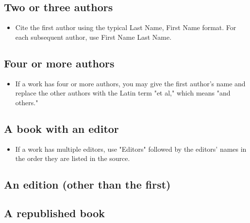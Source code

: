 {\subsection{Two or three authors}



\begin{itemize}\item Cite the first author using the typical Last Name, First Name format. For each subsequent author, use First Name Last Name.\end{itemize}

\subsection{Four or more authors}



\begin{itemize}\item If a work has four or more authors, you may give the first author's name and replace the other authors with the Latin term "et al," which means "and others." \end{itemize}

\subsection{A book with an editor}

\begin{itemize}\item If a work has multiple editors, use "Editors" followed by the editors' names in the order they are listed in the source. \end{itemize}


\subsection{An edition (other than the first)}

\subsection{A republished book}

}

